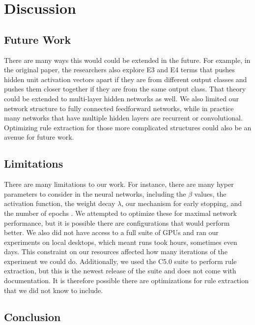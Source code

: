 \section{Discussion}
\label{sec:discussion}

\subsection{Future Work}
\label{sec:futurework}
There are many ways this would could be extended in the future. For
example, in the original paper, the researchers also explore E3 and E4
terms that pushes hidden unit activation vectors apart if they are from different
output classes and pushes them closer together if they are from the
same output class. That theory could be extended to multi-layer hidden
networks as well. We also limited our network structure to fully
connected feedforward networks, while in practice many networks that
have multiple hidden layers are recurrent or convolutional. Optimizing
rule extraction for those more complicated structures could also be an
avenue for future work. 

\subsection{Limitations}
\label{sec:limitations}
There are many limitations to our work. For instance, there are many
hyper parameters to consider in the neural networks, including the
$\beta$ values, the activation function, the weight decay $\lambda$,
our mechanism for early stopping, and the number of epochs
. We attempted to optimize these for maximal network
performance, but it is possible there are configurations that would
perform better. We also did not have access to a full suite of GPUs
and ran our experiments on local desktops, which meant runs took
hours, sometimes even days. This constraint on our resources affected
how many iterations of the experiment we could do. Additionally, we
used the C5.0 suite to perform rule extraction, but this is the newest
release of the suite and does not come with documentation. It is
therefore possible there are optimizations for rule extraction that we
did not know to include.

\subsection{Conclusion}
\label{sec:conclusion}

